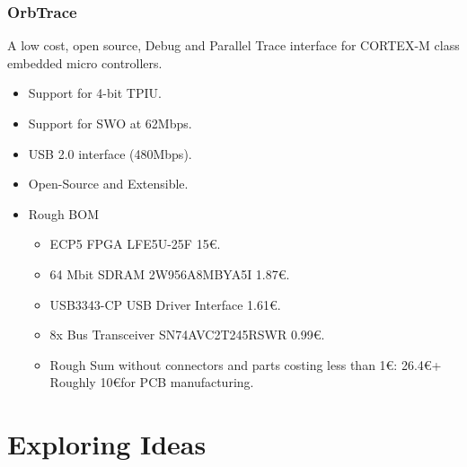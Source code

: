 \documentclass{beamer}
\begin{document}
\begin{frame}
    \frametitle{OrbTrace}
    A low cost, open source, Debug and Parallel Trace interface for
    CORTEX-M class embedded micro controllers.
    \begin{itemize}
        \item Support for 4-bit TPIU.
        \item Support for SWO at 62Mbps.
        \item USB 2.0 interface (480Mbps).
        \item Open-Source and Extensible.
        \item Rough BOM
            \begin{itemize}
                \item ECP5 FPGA LFE5U-25F 15\euro.
                \item 64 Mbit SDRAM 2W956A8MBYA5I 1.87\euro.
                \item USB3343-CP USB Driver Interface 1.61\euro.
                \item 8x Bus Transceiver SN74AVC2T245RSWR 0.99\euro.
                \item Rough Sum without connectors and parts costing less
                    than 1\euro: 26.4\euro + Roughly 10\euro for PCB manufacturing.
            \end{itemize}
    \end{itemize}
\end{frame}

\section{Exploring Ideas}
\end{document}
